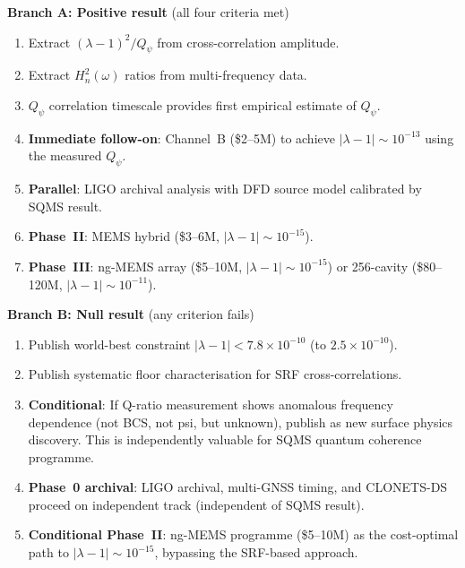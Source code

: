 \documentclass[11pt]{article}
\newcommand{\lbone}{|\lambda - 1|}
\newcommand{\Qpsi}{Q_\psi}
\newcommand{\ee}[1]{\times 10^{#1}}
\newcommand{\Heff}{H_n}
\begin{document}
\begin{tcolorbox}[colback=blue!5!white, colframe=sqmsblue,
  title=\textbf{POST-PHASE~I DECISION TREE}]

\textbf{Branch A: Positive result} (all four criteria met)
\begin{enumerate}[nosep]
\item Extract $(\lambda-1)^2/\Qpsi$ from cross-correlation amplitude.
\item Extract $\Heff^2(\omega)$ ratios from multi-frequency data.
\item $\Qpsi$ correlation timescale provides first empirical estimate of
  $\Qpsi$.
\item \textbf{Immediate follow-on}: Channel~B (\$2--5M) to achieve
  $\lbone \sim 10^{-13}$ using the measured $\Qpsi$.
\item \textbf{Parallel}: LIGO archival analysis with DFD source model
  calibrated by SQMS result.
\item \textbf{Phase~II}: MEMS hybrid (\$3--6M, $\lbone \sim 10^{-15}$).
\item \textbf{Phase~III}: ng-MEMS array (\$5--10M, $\lbone \sim 10^{-15}$)
  or 256-cavity (\$80--120M, $\lbone \sim 10^{-11}$).
\end{enumerate}

\vspace{6pt}
\textbf{Branch B: Null result} (any criterion fails)
\begin{enumerate}[nosep]
\item Publish world-best constraint $\lbone < 7.8\ee{-10}$
  (to $2.5\ee{-10}$).
\item Publish systematic floor characterisation for SRF
  cross-correlations.
\item \textbf{Conditional}: If Q-ratio measurement shows anomalous
  frequency dependence (not BCS, not psi, but unknown), publish as
  new surface physics discovery. This is independently valuable for
  SQMS quantum coherence programme.
\item \textbf{Phase~0 archival}: LIGO archival, multi-GNSS timing, and
  CLONETS-DS proceed on independent track (independent of SQMS result).
\item \textbf{Conditional Phase~II}: ng-MEMS programme (\$5--10M) as
  the cost-optimal path to $\lbone \sim 10^{-15}$, bypassing the
  SRF-based approach.
\end{enumerate}
\end{tcolorbox}


\end{document}
